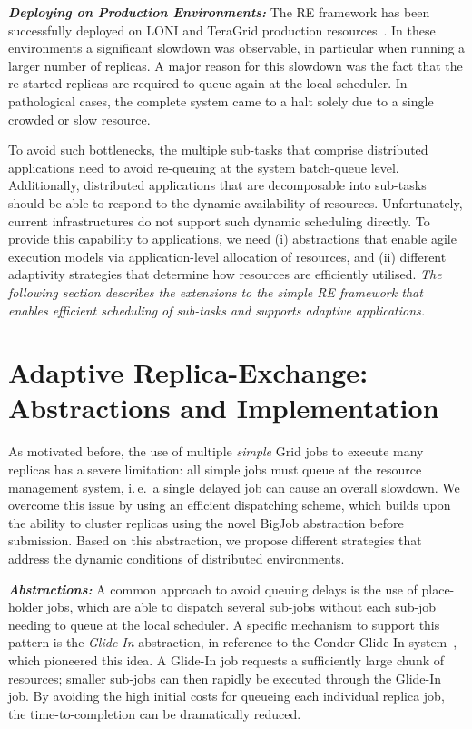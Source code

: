 \documentclass{rspublic}
\begin{document}
\noindent
{\it \bf Deploying on Production Environments:} The RE framework has 
been successfully deployed on LONI and TeraGrid production 
resources~\citep{Luckow:2008la}. In these environments a significant
slowdown was observable, in particular when running a larger number
of replicas.
A major reason for this slowdown was the fact that
the re-started replicas are required to queue again at
the local scheduler.  In pathological cases, the complete system 
came to a halt solely due to a single crowded or slow resource.

To avoid such bottlenecks, the multiple sub-tasks that comprise
distributed applications need to avoid re-queuing at the system
batch-queue level.  Additionally, distributed applications that are
decomposable into sub-tasks should be able to respond to the dynamic
availability of resources.  Unfortunately, current infrastructures do
not support such dynamic scheduling directly. To provide
this capability to applications, we need (i) abstractions that enable
agile execution models via application-level allocation of resources,
and (ii) different adaptivity strategies that determine how resources
are efficiently utilised.  {\it The following section describes the
  extensions to the simple RE framework that enables efficient
  scheduling of sub-tasks and supports adaptive applications.}

\vspace{-0.15in}
\section{Adaptive Replica-Exchange: Abstractions and Implementation}
\label{sec:glidein}

As motivated before, the use of multiple {\it simple} Grid jobs to
execute many replicas has a severe limitation: all simple jobs must
queue at the resource management system, i.\,e.\ a single delayed
job can cause an overall slowdown.  We overcome
this issue by using an efficient dispatching scheme, which builds upon
the ability to cluster replicas using the novel BigJob abstraction
before submission. Based on this abstraction, we propose different
strategies that address the dynamic conditions of distributed
environments.


{\noindent \it \bf Abstractions:} A common approach to
avoid queuing delays is the use of place-holder jobs, which are
able to dispatch several sub-jobs without each sub-job needing to
queue at the local scheduler. A specific mechanism to support this
pattern is the \emph{Glide-In} abstraction, in reference to the Condor
Glide-In system~\citep{citeulike:291860}, which pioneered this idea. A
Glide-In job requests a sufficiently large chunk of resources; smaller
sub-jobs can then rapidly be executed through the Glide-In job.  By
avoiding the high initial costs for queueing each individual replica
job, the time-to-completion can be dramatically reduced.
\end{document}

